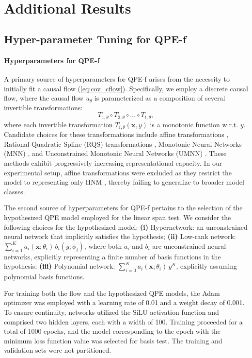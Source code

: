 \documentclass{article}
\theoremstyle{plain}
\theoremstyle{definition}
\theoremstyle{remark}
\begin{document}
\section{Additional Results}

\subsection{Hyper-parameter Tuning for QPE-f}
\label{app:d_hyper_tuning}

\paragraph{Hyperparameters for QPE-f}

A primary source of hyperparameters for QPE-f arises from the necessity to initially fit a causal flow (\cref{eq:cov_cflow}). Specifically, we employ a discrete causal flow, where the causal flow $u_\theta$ is parameterized as a composition of several invertible transformations: $$T_{1,\theta}\circ T_{2,\theta}\circ\dots\circ T_{t,\theta},$$ where each invertible transformation $T_{i,\theta}(\bm{x},y)$ is a monotonic function w.r.t. $y$. Candidate choices for these transformations include affine transformations \citep{Dinh2017}, Rational-Quadratic Spline (RQS) transformations \citep{Durkan2019}, Monotonic Neural Networks (MNN) \citep{Huang2018}, and Unconstrained Monotonic Neural Networks (UMNN) \citep{Wehenkel2019}. These methods exhibit progressively increasing representational capacity. In our experimental setup, affine transformations were excluded as they restrict the model to representing only HNM \citep{Khemakhem2021}, thereby failing to generalize to broader model classes.

The second source of hyperparameters for QPE-f pertains to the selection of the hypothesized QPE model employed for the linear span test. We consider the following choices for the hypothesized model: \textbf{(i)} Hypernetwork: an unconstrained neural network that implicitly satisfies the hypothesis; \textbf{(ii)} Low-rank network: $\sum_{i=1}^K a_{i}(\bm{x};\theta_i)\,b_i(y;\phi_i)$, where both $a_i$ and $b_i$ are unconstrained neural networks, explicitly representing a finite number of basis functions in the hypothesis; \textbf{(iii)} Polynomial network: $\sum_{i=0}^K a_i(\bm{x};\theta_i)\,y^K$, explicitly assuming polynomial basis functions.

For training both the flow and the hypothesized QPE models, the Adam optimizer was employed with a learning rate of 0.01 and a weight decay of 0.001. To ensure continuity, networks utilized the SiLU activation function and comprised two hidden layers, each with a width of 100. Training proceeded for a total of 1000 epochs, and the model corresponding to the epoch with the minimum loss function value was selected for basis test. The training and validation sets were not partitioned.
\end{document}
